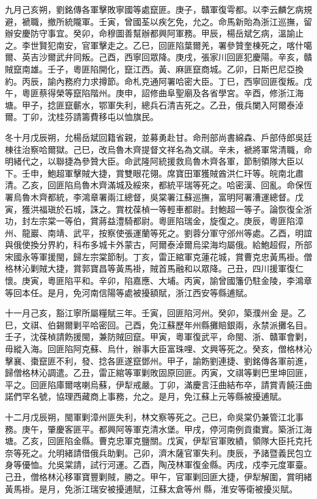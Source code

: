 \begin{pinyinscope}
九月己亥朔，劉銘傳各軍擊敗寧國等處竄匪。庚子，贛軍復雩都。以李云麟乞病規避，褫職，撤所統隴軍。壬寅，曾國荃以疾乞免，允之。命馬新貽為浙江巡撫，留辦安慶防守事宜。癸卯，命穆圖善幫辦都興阿軍務。甲辰，楊岳斌乞病，溫諭止之。李世賢犯南安，官軍擊走之。乙巳，回匪陷葉爾羌，署參贊奎棟死之，喀什噶爾、英吉沙爾武弁同叛。己酉，西寧回眾降。庚戌，張家川回匪犯慶陽。辛亥，贛賊竄南雄。壬子，粵匪陷開化，竄江西。黃、麻匪竄商城。乙卯，日斯巴尼亞換約。丙辰，諭內務府力求撙節。命札克通阿署哈密大臣。丁巳，西寧回匪復叛。戊午，粵匪蔡得榮等竄陷階州。庚申，詔修曲阜聖廟及各省學宮。辛酉，修浙江海塘。甲子，捻匪竄蘄水，鄂軍失利，總兵石清吉死之。乙丑，俄兵闌入阿爾泰淖爾。丁卯，沈桂芬請籌費移屯以恤旗民。

冬十月戊辰朔，允楊岳斌回籍省親，並募勇赴甘。命刑部尚書綿森、戶部侍郎吳廷棟往治察哈爾獄。己巳，改烏魯木齊提督文祥名為文祺。辛未，褫將軍常清職，命明緒代之，以聯捷為參贊大臣。命武隆阿統援救烏魯木齊各軍，節制領隊大臣以下。壬申，鮑超軍擊賊大捷，賞雙眼花翎。席寶田軍獲賊酋洪仁玕等。皖南北肅清。乙亥，回匪陷烏魯木齊滿城及綏來，都統平瑞等死之。哈密漢、回亂。命保恆署烏魯木齊都統，李鴻章署兩江總督，吳棠署江蘇巡撫，富明阿署漕運總督。戊寅，獲洪福瑱於石城，誅之。賞枕葆楨一等輕車都尉。封鮑超一等子。論恢復全浙功，封左宗棠一等伯，賞蔣益澧騎都尉。粵匪陷瑞金，旋復之。庚辰，粵匪陷漳州、龍巖、南靖、武平，按察使張運蘭等死之。劉蓉分軍守邠州等處。乙酉，明誼與俄使換分界約，科布多城卡外蒙古，阿爾泰淖爾烏梁海均屬俄。給鮑超假，所部宋國永等軍援閩，歸左宗棠節制。丁亥，雷正綰軍克蓮花城，賞曹克忠黃馬褂。僧格林沁剿賊大捷，賞郭寶昌等黃馬褂，賊首馬融和以眾降。己丑，四川援軍復仁懷。庚寅，粵匪陷平和。辛卯，陷嘉應、大埔。丙寅，諭曾國籓仍駐金陵，李鴻章等回本任。是月，免河南信陽等處被擾額賦，浙江西安等縣逋賦。

十一月己亥，豁江寧所屬糧賦三年。壬寅，回匪陷河州。癸卯，築濮州金是。乙巳，文祺、伯錫爾剿平哈密回。己酉，免江蘇歷年州縣攤賠銀兩，永禁派攤名目。壬子，沈葆楨請飭援閩，兼防賊回竄。甲寅，粵軍復武平，命閩、浙、贛軍會剿，毋縱入海。回匪陷阿克蘇、烏什，辦事大臣富珠哩、文興等死之。癸亥，僧格林沁擊襄、棗竄匪不利，發、捻各匪遂竄鄧州。甲子，諭飭劉連捷、劉銘傳各軍前進，歸僧格林沁調遣。乙丑，雷正綰等軍剿敗固原回匪。丙寅，文祺等剿巴里坤回匪，平之。回匪陷庫爾喀喇烏蘇，伊犁戒嚴。丁卯，滿慶言汪曲結布卒，請賞青饒汪曲諾們罕名號，協理西藏商上事務，允之。是月，免江蘇上元等縣被擾逋賦。

十二月戊辰朔，閩軍剿漳州匪失利，林文察等死之。己巳，命吳棠仍兼管江北事務。庚午，肇慶客匪平。都興阿等軍克清水堡。甲戌，停河南例貢棗實。築浙江海塘。乙亥，回匪陷金縣。曹克忠軍克鹽關。戊寅，伊犁官軍敗績，領隊大臣托克托奈等死之。允明緒請借俄兵助剿。己卯，濟木薩官軍失利。庚辰，予諸暨義民包立身等優恤。允吳棠請，試行河運。乙酉，陶茂林軍復金縣。丙戌，戍李元度軍臺。己丑，僧格林沁移軍寶豐剿賊，勝之。甲午，官軍剿回匪大捷，伊犁解圍，賞明緒黃馬褂。是月，免浙江瑞安被擾逋賦，江蘇太倉等州縣，淮安等衛被擾災賦。


\end{pinyinscope}
